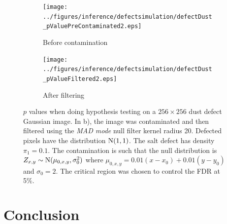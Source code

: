 \begin{figure}[htp]
  \centering
  \begin{subfigure}[b]{0.49\textwidth}
    \texttt{[image: ../figures/inference/defectsimulation/defectDust\_pValuePreContaminated2.eps]}
    \caption{Before contamination}
  \end{subfigure}
  \begin{subfigure}[b]{0.49\textwidth}
    \texttt{[image: ../figures/inference/defectsimulation/defectDust\_pValueFiltered2.eps]}
    \caption{After filtering}
  \end{subfigure}
  \caption{$p$ values when doing hypothesis testing on a $256 \times 256$ dust defect Gaussian image. In b), the image was contaminated and then filtered using the \emph{MAD mode} null filter kernel radius 20. Defected pixels have the distribution $\operatorname{N}(1,1)$. The salt defect has density $\pi_1 = 0.1$. The contamination is such that the null distribution is $Z_{x,y}\sim\operatorname{N}(\mu_{0,x,y},\sigma_0^2)$ where $\mu_{0,x,y} = 0.01 (x-x_0) + 0.01 (y-y_0)$ and $\sigma_0=2$. The critical region was chosen to control the FDR at 5\%.}
\end{figure}

\section{Conclusion}